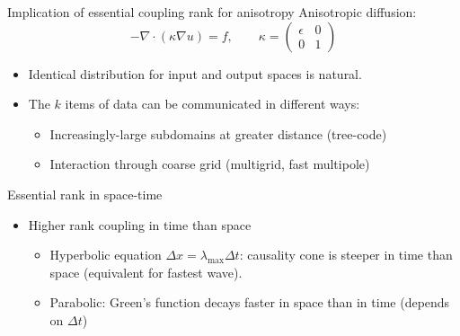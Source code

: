 \documentclass{beamer}
\begin{document}
\begin{frame}{Implication of essential coupling rank for anisotropy}
  Anisotropic diffusion:
  \begin{equation*}
    -\nabla\cdot (\kappa \nabla u) = f, \qquad \kappa =
    \begin{pmatrix}
      \epsilon & 0 \\ 0 & 1
    \end{pmatrix}
  \end{equation*}
  \begin{itemize}
  \item Identical distribution for input and output spaces is natural.
  \item The $k$ items of data can be communicated in different ways:
    \begin{itemize}
    \item Increasingly-large subdomains at greater distance (tree-code)
    \item Interaction through coarse grid (multigrid, fast multipole)
    \end{itemize}
  \end{itemize}
\end{frame}

\begin{frame}{Essential rank in space-time}
  \begin{itemize}
  \item Higher rank coupling in time than space
    \begin{itemize}
    \item Hyperbolic equation $\Delta x = \lambda_{\max} \Delta t$:
      causality cone is steeper in time than space (equivalent for
      fastest wave).
    \item Parabolic: Green's function decays faster in space than in time (depends on $\Delta t$)
    \end{itemize}
  \end{itemize}
\end{frame}
\end{document}
